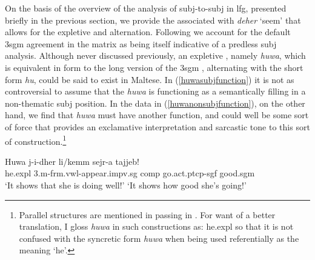 \documentclass[output=paper]{LSP/langsci}
\begin{document}
On the basis of the overview of the analysis of {\sc subj}-to-{\sc subj}  in {\sc lfg}, presented briefly in the previous section, we provide the  associated with \emph{deher} `seem' that allows for the expletive and  alternation. Following  we account for the default {\sc 3sgm} agreement in the matrix as being itself indicative of a {\sc pred}less {\sc subj} analysis. Although never discussed previously, an expletive , namely \emph{huwa}, which is equivalent in form to the long version of the {\sc 3sgm}  , alternating 
with the short form \emph{hu}, could be said to exist in Maltese. In (\ref{huwasubjfunction}) it is not as controversial to assume that the  \emph{huwa} is functioning as a semantically  filling in a non-thematic {\sc subj} position. In the data in (\ref{huwanonsubjfunction}), on the other hand, we find that \emph{huwa} must have another function, and could well be some sort of  force that provides an exclamative interpretation and sarcastic tone to this sort of construction.\footnote{Parallel structures are mentioned in passing in . For want of a better translation, I gloss \emph{huwa} in such constructions as: he.{\sc expl} so that it is not confused with the syncretic form \emph{huwa} when being used referentially as the  meaning `he'.}%


 
\ea \label{huwasubjfunction}
\gll Huwa j-i-dher li/kemm sejr-a tajjeb!\\
he.{\sc expl} 3.{\sc m}-{\sc frm.vwl}-appear.{\sc impv.sg} {\sc comp} go.{\sc act.ptcp-sgf} good.{\sc sgm}\\
\glt `It shows that she is doing well!'
\glt `It shows how good she's going!'
\z 
\end{document}
